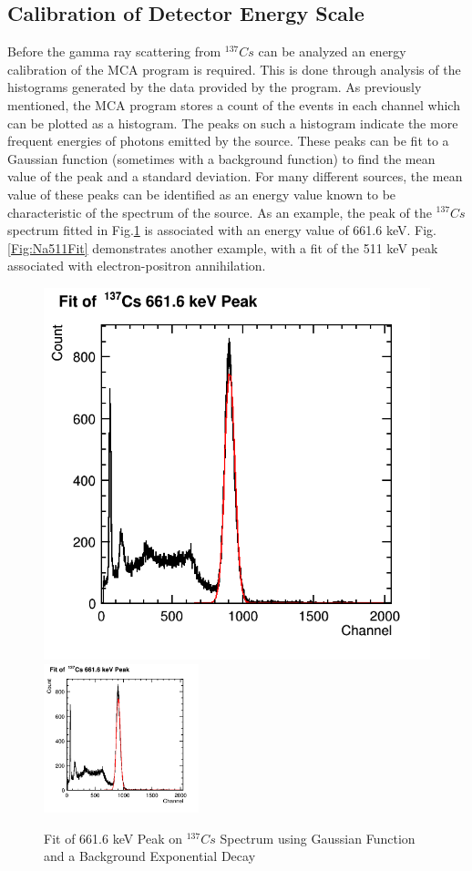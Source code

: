 \documentclass[%
 reprint,
 amsmath,amssymb,
 aps,
 pra,
]{revtex4-1}
\begin{document}
\subsection{Calibration of Detector Energy Scale}
Before the gamma ray scattering from $^{137}Cs$ can be analyzed an energy calibration of the MCA program is required. This is done through analysis of the histograms generated by the data provided by the program. As previously mentioned, the MCA program stores a count of the events in each channel which can be plotted as a histogram. The peaks on such a histogram indicate the more frequent energies of photons emitted by the source. These peaks can be fit to a Gaussian function (sometimes with a background function) to find the mean value of the peak and a standard deviation. For many different sources, the mean value of these peaks can be identified as an energy value known to be characteristic of the spectrum of the source. As an example, the peak of the $^{137}Cs$ spectrum fitted in Fig.\ref{Fig:CsUncalib} is associated with an energy value of 661.6 keV. Fig.\ref{Fig:Na511Fit} demonstrates another example, with a fit of the 511 keV peak associated with electron-positron annihilation.

\begin{figure}[H]
	\centering	
	\includegraphics[scale=0.39]{Cs662keVFit.png}
	\includegraphics[width=0.4\textwidth]{Cs662keVFit.png}
	\caption{Fit of 661.6 keV Peak on $^{137}Cs$ Spectrum using Gaussian Function and a Background Exponential Decay}
	\label{Fig:CsUncalib}
\end{figure}
\end{document}
